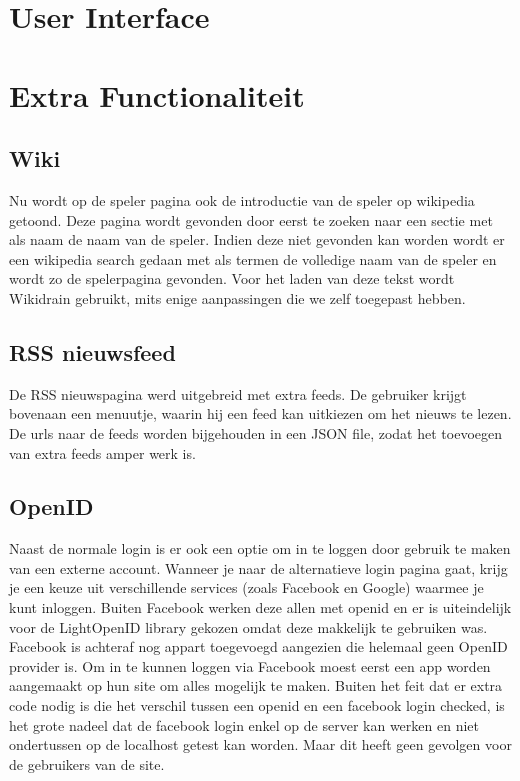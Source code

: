 \documentclass[11pt]{article}
\begin{document}
\section{User Interface}





\section{Extra Functionaliteit}


\subsection{Wiki}

Nu wordt op de speler pagina ook de introductie van de speler op wikipedia getoond.
Deze pagina wordt gevonden door eerst te zoeken naar een sectie met als naam de naam van de speler.
Indien deze niet gevonden kan worden wordt er een wikipedia search gedaan met als termen de volledige naam van de speler en wordt zo de spelerpagina gevonden.
Voor het laden van deze tekst wordt Wikidrain gebruikt, mits enige aanpassingen die we zelf toegepast hebben.


\subsection{RSS nieuwsfeed}

De RSS nieuwspagina werd uitgebreid met extra feeds. De gebruiker krijgt bovenaan een menuutje, waarin hij een feed kan uitkiezen om het nieuws te lezen.
De urls naar de feeds worden bijgehouden in een JSON file, zodat het toevoegen van extra feeds amper werk is.



\subsection{OpenID}

Naast de normale login is er ook een optie om in te loggen door gebruik te maken van een externe account. Wanneer je naar de alternatieve login pagina gaat, krijg je een keuze uit verschillende services (zoals Facebook en Google) waarmee je kunt inloggen. Buiten Facebook werken deze allen met openid en er is uiteindelijk voor de LightOpenID library gekozen omdat deze makkelijk te gebruiken was. Facebook is achteraf nog appart toegevoegd aangezien die helemaal geen OpenID provider is. Om in te kunnen loggen via Facebook moest eerst een app worden aangemaakt op hun site om alles mogelijk te maken. Buiten het feit dat er extra code nodig is die het verschil tussen een openid en een facebook login checked, is het grote nadeel dat de facebook login enkel op de server kan werken en niet ondertussen op de localhost getest kan worden. Maar dit heeft geen gevolgen voor de gebruikers van de site.
\end{document}
